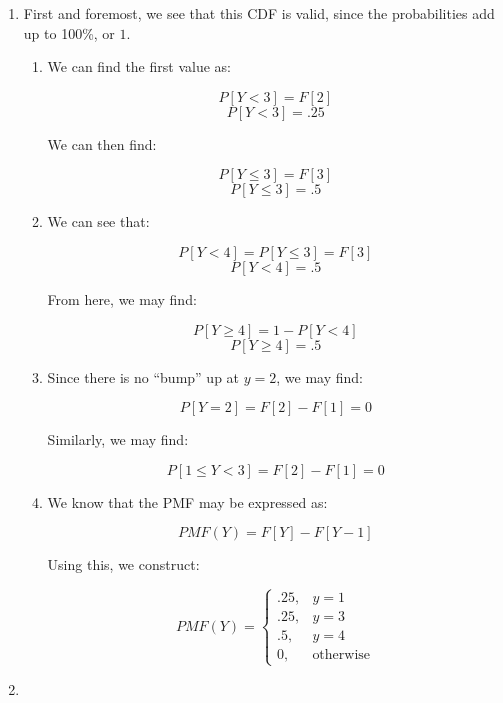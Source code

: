 \begin{enumerate}
\begin{enumerate}
      \item 

      \item 

      \item 

    \end{enumerate}

  \item First and foremost, we see that this CDF is valid, since the probabilities add up to 100\%, or $1$.

    \begin{enumerate}

      \item We can find the first value as:

        $$P[Y<3] = F[2]$$
        $$\boxed{P[Y<3] =.25}$$

        We can then find:

        $$P[Y\leq 3]=F[3]$$
        $$\boxed{P[Y\leq3] =.5}$$

      \item We can see that:

        $$P[Y< 4]=P[Y\leq 3]=F[3]$$
        $$\boxed{P[Y< 4]=.5}$$

        From here, we may find:

        $$P[Y\geq 4]=1-P[Y<4]$$
        $$\boxed{P[Y\geq 4]=.5}$$

      \item Since there is no ``bump'' up at $y=2$, we may find:

        $$\boxed{P[Y=2]=F[2]-F[1]=0}$$

        Similarly, we may find:

        $$\boxed{P[1\leq Y<3]=F[2]-F[1]=0}$$

      \item We know that the PMF may be expressed as:

        $$PMF(Y)=F[Y]-F[Y-1]$$

        Using this, we construct:

        $$\boxed{PMF(Y)=\left\{ \begin{array}{ll} .25, & y=1\\.25, & y=3\\.5, & y=4\\ 0, & \text{otherwise} \end{array}}$$

    \end{enumerate}

  \item 


\end{enumerate}
